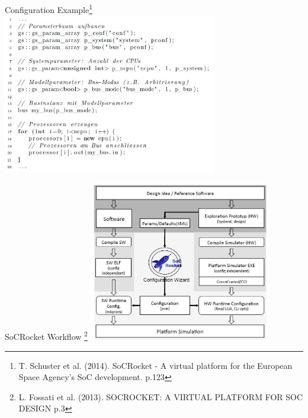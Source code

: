 \begin{frame}{Configuration Example\footnote{T. Schuster et al. (2014). SoCRocket - A virtual platform for the European Space Agency's SoC development. p.123}}
    \includegraphics[height=7cm]{pictures/configurationExample.JPG}
\end{frame}

\begin{frame}{SoCRocket Workflow \footnote{L. Fossati et al. (2013). SOCROCKET: A VIRTUAL PLATFORM FOR SOC DESIGN p.3}}
    \centering
    \includegraphics[height=7cm]{pictures/SoCRocket_workflow.JPG}
\end{frame}



